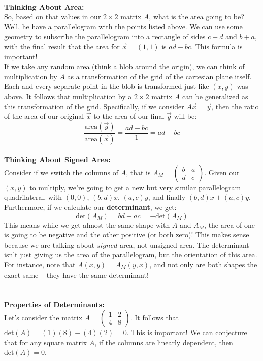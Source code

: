 \documentclass[12pt]{amsart}
\begin{document}
\\
\textbf{Thinking About Area: }\\
So, based on that values in our $2\times2$ matrix $A$, what is the area going to be? Well, he have a parallelogram with the points listed above. We can use some geometry to subscribe the parallelogram into a rectangle of sides $c+d$ and $b+a$, with the final result that the area for $\vec{x}=(1,1)$ is $ad-bc$. This formula is important!\\
If we take any random area (think a blob around the origin), we can think of multiplication by $A$ as a transformation of the grid of the cartesian plane itself. Each and every separate point in the blob is transformed just like $(x,y)$ was above. It follows that multiplication by a $2\times2$ matrix $A$ can be generalized as this transformation of the grid. Specifically, if we consider $A\vec{x}=\vec{y}$, then the ratio of the area of our original $\vec{x}$ to the area of our final $\vec{y}$ will be:
\[\frac{\mathrm{area}(\vec{y})}{\mathrm{area}(\vec{x})} = \frac{ad-bc}{1} = ad-bc\]\\
\textbf{Thinking About Signed Area:}\\
Consider if we switch the columns of $A$, that is $A_M=\begin{pmatrix}b&a\\d&c\end{pmatrix}$. Given our $(x,y)$ to multiply, we're going to get a new but very similar parallelogram quadrilateral, with $(0,0)$, $(b,d)x$, $(a,c)y$, and finally $(b,d)x+(a,c)y$. Furthermore, if we calculate our \textbf{determinant}, we get: 
	\[\mathrm{det}(A_M) = bd-ac = -\mathrm{det}(A_M)\]
This means while we get almost the same shape with $A$ and $A_M$, the area of one is going to be negative and the other positive (or both zero)! This makes sense because we are talking about $signed$ area, not unsigned area. The determinant isn't just giving us the area of the parallelogram, but the orientation of this area. For instance, note that $A(x,y)=A_M(y,x)$, and not only are both shapes the exact same -- they have the same determinant!\\ \\ \\
\textbf{Properties of Determinants:}\\
Let's consider the matrix $A=\begin{pmatrix}1&2\\4&8\end{pmatrix}$. It follows that $\mathrm{det}(A)=(1)(8)-(4)(2)=0$. This is important! We can conjecture that for any square matrix $A$, if the columns are linearly dependent, then  $\mathrm{det}(A)=0$.\\
\end{document}

